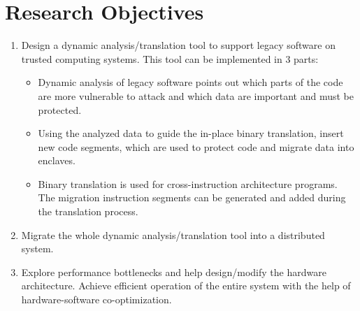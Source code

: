 \section{Research Objectives}
\begin{enumerate}
    \item Design a dynamic analysis/translation tool to support legacy
    software on trusted computing systems. This tool can be implemented
    in 3 parts:
    \begin{itemize}
        \item Dynamic analysis of legacy software points out which parts of the code are
        more vulnerable to attack and which data are important and must be protected.
        \item Using the analyzed data to guide the in-place binary translation,
        insert new code segments, which are used to protect code and migrate data into enclaves.
        \item Binary translation is used for cross-instruction architecture programs. The migration
        instruction segments can be generated and added during the translation process.
    \end{itemize}
    \item Migrate the whole dynamic analysis/translation tool into a distributed system.
    \item Explore performance bottlenecks and help design/modify the hardware architecture.
    Achieve efficient operation of the entire system with the help of hardware-software
    co-optimization.
\end{enumerate}